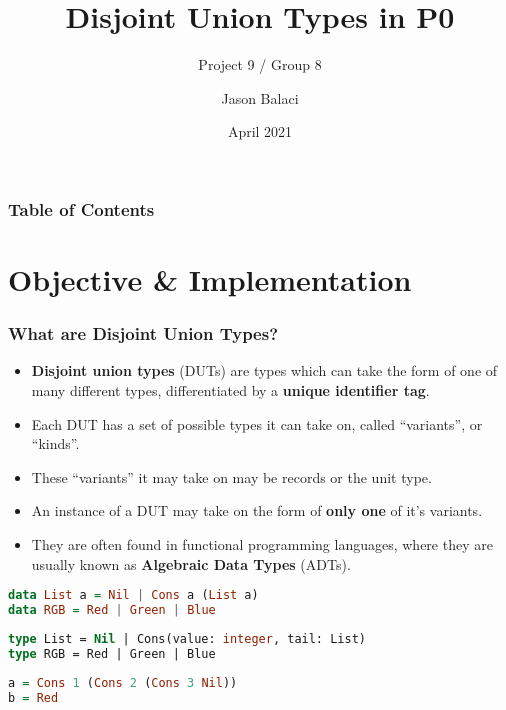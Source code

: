 \documentclass{beamer}
\title[Disjoint Union Types]{Disjoint Union Types in P0}
\subtitle{Project 9 / Group 8}
\author{Jason Balaci}
\institute{McMaster University}
\date{April 2021}
\begin{document}
\frame{\titlepage}

\begin{frame}
\frametitle{Table of Contents}
\tableofcontents
\end{frame}

\section{Objective \& Implementation}

\begin{frame}
\frametitle{What are Disjoint Union Types?}

\begin{itemize}
 \item<1-> \textbf{Disjoint union types} (DUTs) are types which can take the form of one of many different types, differentiated by a \textbf{unique identifier tag}.
 \item<2-> Each DUT has a set of possible types it can take on, called ``variants'', or ``kinds''.
 \item<3-> These ``variants'' it may take on may be records or the unit type.
 \item<4-> An instance of a DUT may take on the form of \textbf{only one} of it's variants. 
 \item<5-> They are often found in functional programming languages, where they are usually known as \textbf{Algebraic Data Types} (ADTs).
\end{itemize}

\end{frame}

\begin{lrbox}{\haskellTypes}
\begin{lstlisting}[language=Haskell, basicstyle=\footnotesize]
data List a = Nil | Cons a (List a)
data RGB = Red | Green | Blue
\end{lstlisting}
\end{lrbox}

\begin{lrbox}{\pZeroTypes}
\begin{lstlisting}[language=Pascal, basicstyle=\footnotesize]
type List = Nil | Cons(value: integer, tail: List)
type RGB = Red | Green | Blue
\end{lstlisting}
\end{lrbox}


\begin{lrbox}{\haskellTypesInst}
\begin{lstlisting}[language=Haskell, basicstyle=\footnotesize]
a = Cons 1 (Cons 2 (Cons 3 Nil))
b = Red
\end{lstlisting}
\end{lrbox}
\end{document}
